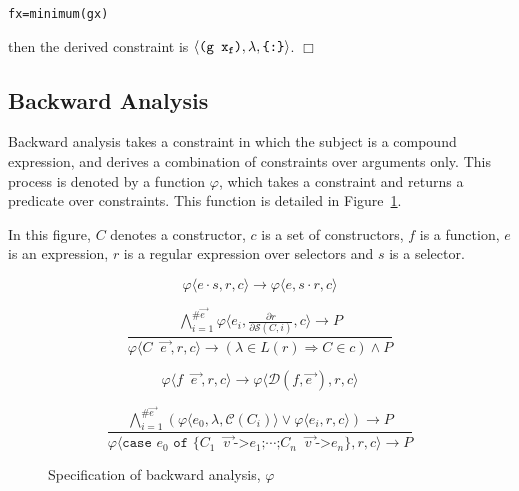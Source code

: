 \documentclass[preprint]{sigplanconf}
\newcommand{\T}[1]{\texttt{#1}}
\newcommand{\tup}[1]{\ensuremath{\langle #1 \rangle}}
\newcommand{\noexample}{\hfill$\Box$}
\newenvironment{code}{\begin{alltt}\small}{\end{alltt}}
\newcommand{\D}{\ensuremath{\cdot}} %
\renewcommand{\c}[3]{\tup{\T{#1},\T{#2},\T{\{#3\}}}}
\newcommand{\cc}[2]{\c{#1}{$\lambda$}{#2}}
\newcommand{\s}[1]{\ensuremath{_{\tt #1}}} %
\newcommand{\vecto}[1]{\overrightarrow{#1\;}}
\newcommand{\gap}{\;\;}
\begin{document}
\begin{code}
f x = minimum (g x)
\end{code}

\noindent then the derived constraint is \cc{(g x\s{f})}{:}.
\noexample

\subsection{Backward Analysis}
\label{sec:backward}

Backward analysis takes a constraint in which the subject is a
compound expression, and derives a combination of constraints over
arguments only. This process is denoted by a function $\varphi$,
which takes a constraint and returns a predicate over constraints.
This function is detailed in Figure~\ref{fig:backward}.

In this figure, $C$ denotes a constructor, $c$ is a set of
constructors, $f$ is a function, $e$ is an expression, $r$ is a
regular expression over selectors and $s$ is a selector.

\begin{figure}

\renewcommand\theequation{sel}
\begin{equation}
    \varphi\tup{e\D{}s,r,c} \rightarrow
    \varphi\tup{e,s\D{}r,c}
\end{equation}

\renewcommand\theequation{con}
\begin{equation}
\frac
    {
        \bigwedge_{i=1}^{\#\vecto{e}}
        \varphi\tup{e_i,\frac{\partial r}{\partial \mathcal{S}(C,i)},c}
        \rightarrow P
    }
    {
        \varphi\tup{C \gap \vecto{e},r,c}
        \rightarrow (\lambda \in L(r) \Rightarrow C \in c) \wedge P
    }
\end{equation}

\renewcommand\theequation{app}
\begin{equation}
    \varphi\tup{f \gap \vecto{e},r,c} \rightarrow
    \varphi\tup{\mathcal{D}(f, \vecto{e}),r,c}
\end{equation}

\renewcommand\theequation{cas}
\begin{equation}
\frac
    {
        \bigwedge_{i=1}^{\#\vecto{e}}
        (
            \varphi\tup{e_0,\lambda,\mathcal{C}(C_i)} \vee
            \varphi\tup{e_i,r,c}
        ) \rightarrow P
    }
    {
        \varphi\tup{\T{case } e_0 \T{ of \{}C_1 \gap \vecto{v} \T{->} e_1\T{;} \cdots
        \T{;} C_n \gap \vecto{v} \T{->} e_n \},r,c} \rightarrow P
    }
\end{equation}

\caption{Specification of backward analysis, $\varphi$} %
\label{fig:backward}
\end{figure}
\end{document}
